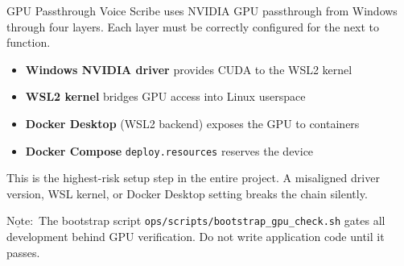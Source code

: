 \documentclass{beamer}
\newcommand{\nt}{$\underline{\text{Note}}:$ }
\begin{document}
\begin{frame}{GPU Passthrough}
    \small
    Voice Scribe uses NVIDIA GPU passthrough from Windows through
    four layers. Each layer must be correctly configured for the
    next to function.

    \vspace{0.3em}
    \begin{itemize}\setlength{\itemsep}{2pt}
        \item \textbf{Windows NVIDIA driver} provides CUDA to the WSL2 kernel
        \item \textbf{WSL2 kernel} bridges GPU access into Linux userspace
        \item \textbf{Docker Desktop} (WSL2 backend) exposes the GPU to containers
        \item \textbf{Docker Compose} \texttt{deploy.resources} reserves the device
    \end{itemize}

    \vspace{0.2em}
    This is the highest-risk setup step in the entire project.
    A misaligned driver version, WSL kernel, or Docker Desktop setting
    breaks the chain silently.

    \vspace{0.2em}
    \nt The bootstrap script \texttt{ops/scripts/bootstrap\_gpu\_check.sh}
    gates all development behind GPU verification. Do not write
    application code until it passes.
\end{frame}
\end{document}
